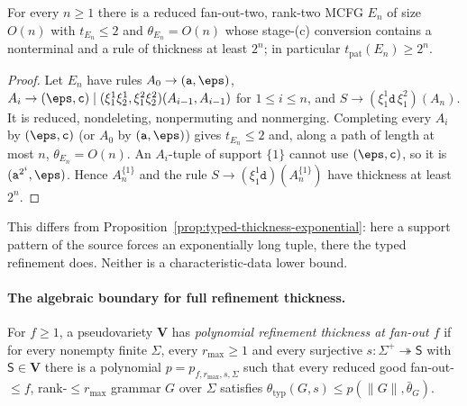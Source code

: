 \begin{proposition}
\label{prop:empty-component-blowup}
For every $n\ge1$ there is a reduced fan-out-two, rank-two MCFG $E_n$ of size $O(n)$
with $t_{E_n}\le2$ and $\theta_{E_n}=O(n)$ whose stage-(c) conversion contains a
nonterminal and a rule of thickness at least $2^n$; in particular
$t_{\mathrm{pat}}(E_n)\ge2^n$.
\end{proposition}

\begin{proof}
Let $E_n$ have rules
$A_0\to(\mathtt a,\eps)$, $A_i\to(\eps,\mathtt c)\mid(\xi_1^1\xi_2^1,\xi_1^2\xi_2^2)
(A_{i-1},A_{i-1})$ for $1\le i\le n$, and $S\to(\xi_1^1\mathtt d\,\xi_1^2)(A_n)$.  It is
reduced, nondeleting, nonpermuting and nonmerging.  Completing every $A_i$ by
$(\eps,\mathtt c)$ (or $A_0$ by $(\mathtt a,\eps)$) gives $t_{E_n}\le2$ and, along a
path of length at most $n$, $\theta_{E_n}=O(n)$.  An $A_i$-tuple of support $\{1\}$
cannot use $(\eps,\mathtt c)$, so it is $(\mathtt a^{2^i},\eps)$.  Hence $A_n^{\{1\}}$ and
the rule $S\to(\xi_1^1\mathtt d)(A_n^{\{1\}})$ have thickness at least $2^n$.
\end{proof}

This differs from Proposition~\ref{prop:typed-thickness-exponential}: here a support
pattern of the source forces an exponentially long tuple, there the typed refinement
does.  Neither is a characteristic-data lower bound.

\paragraph{The algebraic boundary for full refinement thickness.}
For $f\ge1$, a
pseudovariety $\mathbf V$ has \emph{polynomial refinement thickness at fan-out
$f$} if for every nonempty finite $\Sigma$, every $r_{\max}\ge1$ and every
surjective $s:\Sigma^+\twoheadrightarrow\mathsf S$ with $\mathsf S\in\mathbf V$ there
is a polynomial $p=p_{f,r_{\max},s,\Sigma}$ such that every reduced good
fan-out-$\le f$, rank-$\le r_{\max}$ grammar $G$ over $\Sigma$ satisfies
$\theta_{\mathrm{typ}}(G,s)\le p(\|G\|,\bar\theta_G)$.

